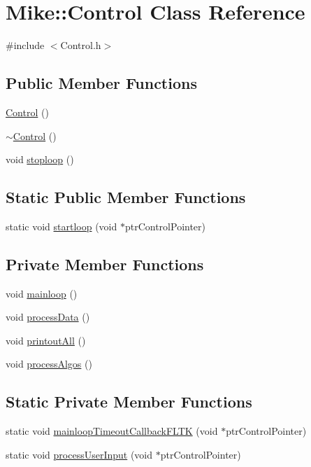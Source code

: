 \hypertarget{class_mike_1_1_control}{}\section{Mike\+:\+:Control Class Reference}
\label{class_mike_1_1_control}


{\ttfamily \#include $<$Control.\+h$>$}

\subsection*{Public Member Functions}
\begin{DoxyCompactItemize}
\item 
\hyperlink{class_mike_1_1_control_ac9a2e3b56773b1eadab7297327a9fbcc}{Control} ()
\item 
\hyperlink{class_mike_1_1_control_aa3395e0509ab5b980732ab0e3a29ce4d}{$\sim$\+Control} ()
\item 
void \hyperlink{class_mike_1_1_control_aa26389eedd6e1c60fa64fe7883ce6ce8}{stoploop} ()
\end{DoxyCompactItemize}
\subsection*{Static Public Member Functions}
\begin{DoxyCompactItemize}
\item 
static void \hyperlink{class_mike_1_1_control_ae34c60ef30c2de2332df13b644c7791f}{startloop} (void $\ast$ptr\+Control\+Pointer)
\end{DoxyCompactItemize}
\subsection*{Private Member Functions}
\begin{DoxyCompactItemize}
\item 
void \hyperlink{class_mike_1_1_control_a3440083f03f7da3d4490fa44bc13d62b}{mainloop} ()
\item 
void \hyperlink{class_mike_1_1_control_a887652b2503a6e881fcceca36f0a0af9}{process\+Data} ()
\item 
void \hyperlink{class_mike_1_1_control_a2f239c6bace6fba6d31d54919b7ee6e1}{printout\+All} ()
\item 
void \hyperlink{class_mike_1_1_control_acf3d41cb5dd54a2ee31cfb0709a79e7e}{process\+Algos} ()
\end{DoxyCompactItemize}
\subsection*{Static Private Member Functions}
\begin{DoxyCompactItemize}
\item 
static void \hyperlink{class_mike_1_1_control_ac627d3cc73f39181fbfabfa01eb47f85}{mainloop\+Timeout\+Callback\+F\+L\+TK} (void $\ast$ptr\+Control\+Pointer)
\item 
static void \hyperlink{class_mike_1_1_control_a248ae37034b449f3385b28cd1a79af8a}{process\+User\+Input} (void $\ast$ptr\+Control\+Pointer)
\end{DoxyCompactItemize}
